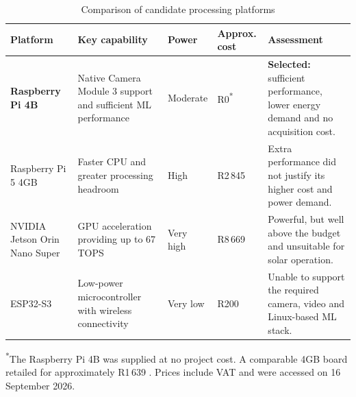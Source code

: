 \begin{table}[htbp]
    \centering
    \caption{Comparison of candidate processing platforms}
    \label{tab:microcomputer-comparison}
    \small
    \renewcommand{\arraystretch}{1.15}

    \begin{tabularx}{\textwidth}{
        >{\raggedright\arraybackslash}p{2.2cm}
        >{\raggedright\arraybackslash}X
        >{\centering\arraybackslash}p{1.3cm}
        >{\centering\arraybackslash}p{1.9cm}
        >{\raggedright\arraybackslash}X}

        \toprule
        \textbf{Platform} & \textbf{Key capability} &
        \textbf{Power} & \textbf{Approx. cost} &
        \textbf{Assessment} \\
        \midrule

        \rowcolor{green!12}
        \textbf{Raspberry Pi 4B} &
        Native Camera Module 3 support and sufficient ML performance &
        Moderate &
        R0\textsuperscript{*} &
        \textbf{Selected:} sufficient performance, lower energy demand and no acquisition cost. \\

        Raspberry Pi 5 4GB &
        Faster CPU and greater processing headroom &
        High &
        R2\,845 \cite{CommunicaRPi5} &
        Extra performance did not justify its higher cost and power demand. \\

        NVIDIA Jetson Orin Nano Super &
        GPU acceleration providing up to 67 TOPS &
        Very high &
        R8\,669 \cite{RSJetsonOrinNano} &
        Powerful, but well above the budget and unsuitable for solar operation. \\

        ESP32-S3 &
        Low-power microcontroller with wireless connectivity &
        Very low &
        R200 \cite{PiShopESP32S3} &
        Unable to support the required camera, video and Linux-based ML stack. \\

        \bottomrule
    \end{tabularx}

    \vspace{2pt}
    \footnotesize{\textsuperscript{*}The Raspberry Pi 4B was supplied at no
    project cost. A comparable 4GB board retailed for approximately
    R1\,639 \cite{PrototypeDIYRPi4B}. Prices include VAT and were accessed
    on 16 September 2026.}
\end{table}

